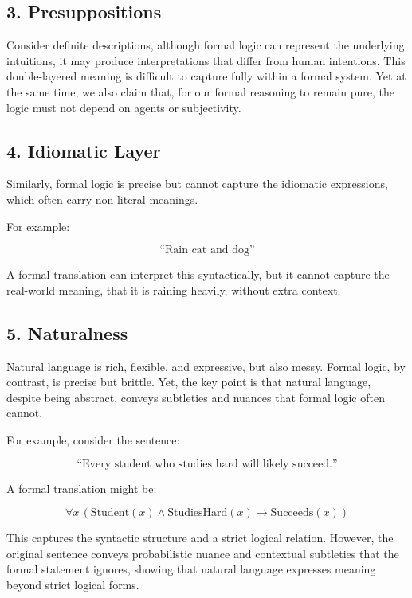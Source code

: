 \subsection{3. Presuppositions}\label{presuppositions}

Consider definite descriptions, although formal logic can represent the
underlying intuitions, it may produce interpretations that differ from
human intentions. This double-layered meaning is difficult to capture
fully within a formal system. Yet at the same time, we also claim that,
for our formal reasoning to remain pure, the logic must not depend on
agents or subjectivity.

\subsection{4. Idiomatic Layer}\label{idiomatic-layer}

Similarly, formal logic is precise but cannot capture the idiomatic
expressions, which often carry non-literal meanings.

For example:

\[\text{“Rain cat and dog”}\]

A formal translation can interpret this syntactically, but it cannot
capture the real-world meaning, that it is raining heavily, without
extra context.

\subsection{5. Naturalness}\label{naturalness}

Natural language is rich, flexible, and expressive, but also messy.
Formal logic, by contrast, is precise but brittle. Yet, the key point is
that natural language, despite being abstract, conveys subtleties and
nuances that formal logic often cannot.

For example, consider the sentence:

\[\text{“Every student who studies hard will likely succeed.”}\]

A formal translation might be:

\[
\forall x \, (\text{Student}(x) \wedge \text{StudiesHard}(x) \rightarrow \text{Succeeds}(x))
\]

This captures the syntactic structure and a strict logical relation.
However, the original sentence conveys probabilistic nuance and
contextual subtleties that the formal statement ignores, showing that
natural language expresses meaning beyond strict logical forms.
